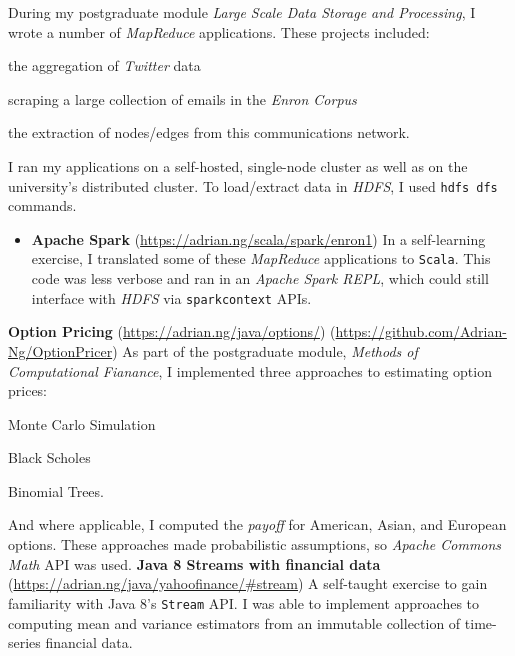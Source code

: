 \documentclass[letterpaper,11pt]{article}
\begin{document}
\small
\newline
During my postgraduate module \textit{Large Scale Data Storage and Processing}, I wrote a number of \textit{MapReduce} applications. These projects included:
\begin{itemize*}
	\item the aggregation of \textit{Twitter} data
	\item scraping a large collection of emails in the \textit{Enron Corpus}
	\item the extraction of nodes/edges from this communications network.
\end{itemize*}
I ran my applications on a self-hosted, single-node cluster as well as on the university's distributed cluster. To load/extract data in \textit{HDFS}, I used \texttt{hdfs dfs} commands.
\begin{itemize}
	\item
	      \textbf{Apache Spark}
	      \hfill
	      \tiny
	      (\href{https://adrian.ng/scala/spark/enron1}{https://adrian.ng/scala/spark/enron1})
	      \small
	      \newline
	      In a self-learning exercise, I translated some of these \textit{MapReduce} applications to \texttt{Scala}. This code was less verbose and ran in an \textit{Apache Spark REPL}, which could still interface with \textit{HDFS} via \texttt{sparkcontext} APIs.
\end{itemize}
\noindent
\textbf{Option Pricing}
\hfill
\tiny
(\href{https://adrian.ng/java/options/}{https://adrian.ng/java/options/}) \quad (\href{https://github.com/Adrian-Ng/OptionPricer}{https://github.com/Adrian-Ng/OptionPricer})
\newline
\small
As part of the postgraduate module, \textit{Methods of Computational Fianance}, I implemented three approaches to estimating option prices:
\begin{itemize*}
	\item Monte Carlo Simulation
	\item Black Scholes
	\item Binomial Trees.
\end{itemize*}
And where applicable, I computed the \textit{payoff} for American, Asian, and European options.
These approaches made probabilistic assumptions, so \textit{Apache Commons Math} API was used.
\newline \newline
\noindent
\textbf{Java 8 Streams with financial data}
\hfill
\tiny
(\href{https://adrian.ng/java/yahoofinance/\#stream}{https://adrian.ng/java/yahoofinance/\#stream})
\small
\newline
A self-taught exercise to gain familiarity with Java 8's \texttt{Stream} API. I was able to implement approaches to computing mean and variance estimators from an immutable collection of time-series financial data.
\end{document}
